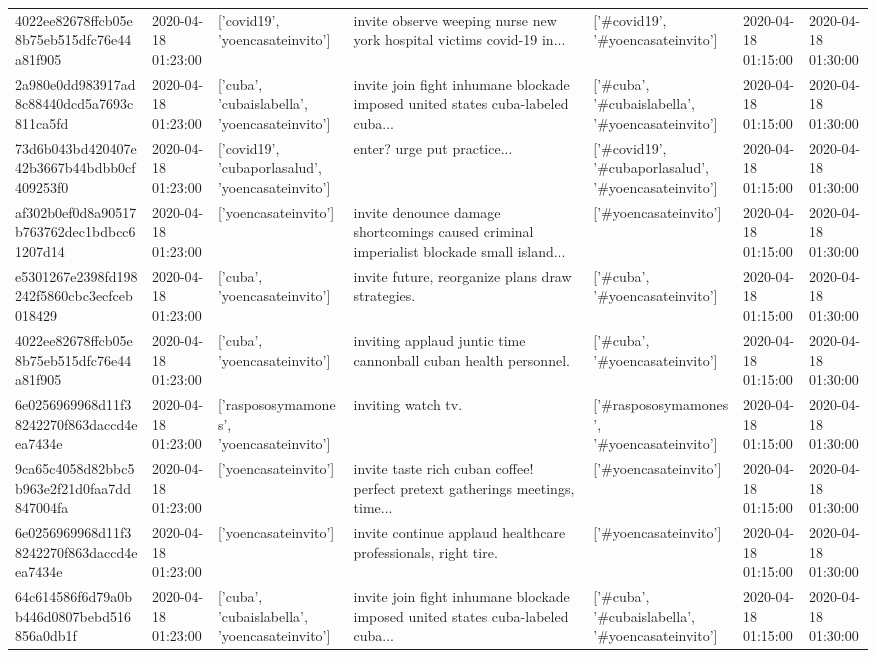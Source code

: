 \begin{tabular}{lllllll}
4022ee82678ffcb05e8b75eb515dfc76e44a81f905 & 2020-04-18 01:23:00 & ['covid19', 'yoencasateinvito'] & invite observe weeping nurse new york hospital victims covid-19 in... & ['#covid19', '#yoencasateinvito'] & 2020-04-18 01:15:00 & 2020-04-18 01:30:00 \\
2a980e0dd983917ad8c88440dcd5a7693c811ca5fd & 2020-04-18 01:23:00 & ['cuba', 'cubaislabella', 'yoencasateinvito'] & invite join fight inhumane blockade imposed united states cuba-labeled cuba... & ['#cuba', '#cubaislabella', '#yoencasateinvito'] & 2020-04-18 01:15:00 & 2020-04-18 01:30:00 \\
73d6b043bd420407e42b3667b44bdbb0cf409253f0 & 2020-04-18 01:23:00 & ['covid19', 'cubaporlasalud', 'yoencasateinvito'] & enter? urge put practice... & ['#covid19', '#cubaporlasalud', '#yoencasateinvito'] & 2020-04-18 01:15:00 & 2020-04-18 01:30:00 \\
af302b0ef0d8a90517b763762dec1bdbcc61207d14 & 2020-04-18 01:23:00 & ['yoencasateinvito'] & invite denounce damage shortcomings caused criminal imperialist blockade small island... & ['#yoencasateinvito'] & 2020-04-18 01:15:00 & 2020-04-18 01:30:00 \\
e5301267e2398fd198242f5860cbc3ecfceb018429 & 2020-04-18 01:23:00 & ['cuba', 'yoencasateinvito'] & invite future, reorganize plans draw strategies. & ['#cuba', '#yoencasateinvito'] & 2020-04-18 01:15:00 & 2020-04-18 01:30:00 \\
4022ee82678ffcb05e8b75eb515dfc76e44a81f905 & 2020-04-18 01:23:00 & ['cuba', 'yoencasateinvito'] & inviting applaud juntic time cannonball cuban health personnel. & ['#cuba', '#yoencasateinvito'] & 2020-04-18 01:15:00 & 2020-04-18 01:30:00 \\
6e0256969968d11f38242270f863daccd4eea7434e & 2020-04-18 01:23:00 & ['raspososymamones', 'yoencasateinvito'] & inviting watch tv. & ['#raspososymamones', '#yoencasateinvito'] & 2020-04-18 01:15:00 & 2020-04-18 01:30:00 \\
9ca65c4058d82bbc5b963e2f21d0faa7dd847004fa & 2020-04-18 01:23:00 & ['yoencasateinvito'] & invite taste rich cuban coffee! perfect pretext gatherings meetings, time... & ['#yoencasateinvito'] & 2020-04-18 01:15:00 & 2020-04-18 01:30:00 \\
6e0256969968d11f38242270f863daccd4eea7434e & 2020-04-18 01:23:00 & ['yoencasateinvito'] & invite continue applaud healthcare professionals, right tire. & ['#yoencasateinvito'] & 2020-04-18 01:15:00 & 2020-04-18 01:30:00 \\
64c614586f6d79a0bb446d0807bebd516856a0db1f & 2020-04-18 01:23:00 & ['cuba', 'cubaislabella', 'yoencasateinvito'] & invite join fight inhumane blockade imposed united states cuba-labeled cuba... & ['#cuba', '#cubaislabella', '#yoencasateinvito'] & 2020-04-18 01:15:00 & 2020-04-18 01:30:00 \\

\end{tabular}
